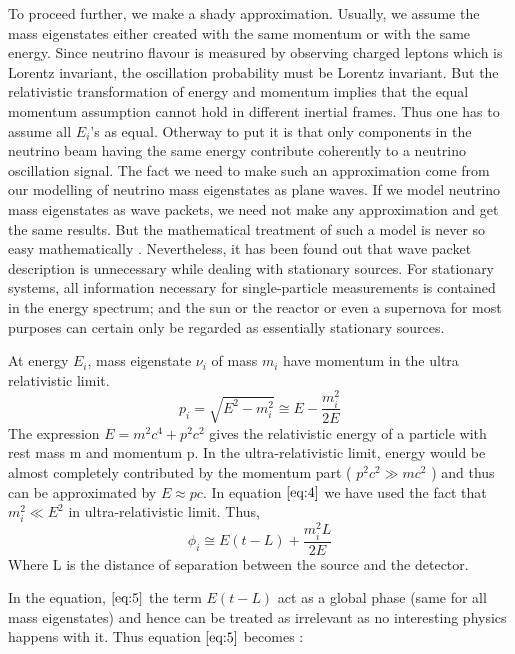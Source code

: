 \documentclass[12pt,a4paper]{report}
\begin{document}
To proceed further, we make a shady approximation. Usually, we assume the mass eigenstates either created with the same momentum or with the same energy. Since neutrino flavour is measured by observing charged leptons which is Lorentz invariant, the oscillation probability must be Lorentz invariant. But the relativistic transformation of energy and momentum implies that the equal momentum assumption cannot hold in different inertial frames\cite{giunti2003}. Thus one has to assume all $E_{i}$’s as equal\cite{stodolsky}\cite{lipkin}\cite{obkun}. Otherway to put it is that only components in the neutrino beam having the same energy contribute coherently to a neutrino oscillation signal.  The fact we need to make such an approximation come from our modelling of neutrino mass eigenstates as plane waves. If we model neutrino mass eigenstates as wave packets, we need not make any approximation and get the same results. But the mathematical treatment of such a model is never so easy mathematically \cite{giunti1991}\cite{giunti1998}\cite{giunti2004}. Nevertheless, it has been found out that wave packet description is unnecessary while dealing with stationary sources. For stationary systems, all information necessary for single-particle measurements is contained in the energy spectrum; and the sun or the reactor or even a supernova for most purposes can certain only be regarded as essentially stationary sources\cite{stodolsky}. \par
At energy $E_{i}$, mass eigenstate $\nu_{i}$ of mass $m_{i}$ have momentum in the ultra relativistic limit.
\begin{equation}
\label{eq:4}
p_{i} = \sqrt{ E^{2} - m_{i}^{2}} \cong E-\frac{m_{i}^{2}}{2E}
\end{equation}
The expression $E = m^{2}c^{4} + p^{2}c^{2}$ gives the relativistic energy of a particle with rest mass m and momentum p. In the ultra-relativistic limit, energy would be almost completely contributed by the momentum part ( $ p^{2}c^{2} \gg mc^{2}$ ) and thus can be approximated by $ E \approx pc $. In equation $\ref{eq:4}$ we have used the fact that $m_{i}^2 \ll E^{2}$ in ultra-relativistic limit. Thus,
\begin{equation}
\label{eq:5}
\phi_{i} \cong E( t - L) + \frac{m_{i}^2 L}{2E}
\end{equation}
Where L is the distance of separation between the source and the detector.\par
In the equation, $\ref{eq:5}$  the term $ E( t - L)$ act as a global phase (same for all mass eigenstates) and hence can be treated as irrelevant as no interesting physics happens with it. Thus equation $\ref{eq:5}$ becomes :
\end{document}
